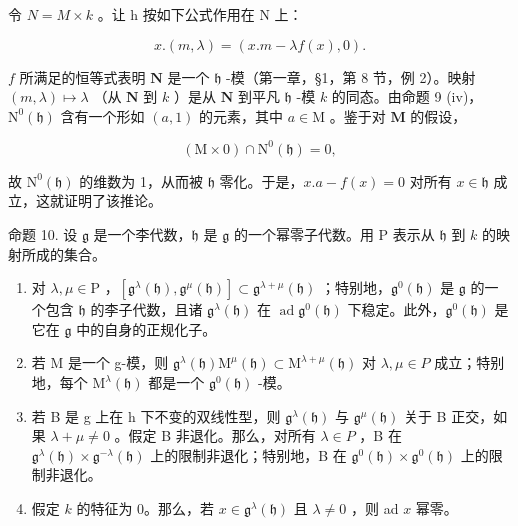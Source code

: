 令 \(N = M \times k\) 。让 h 按如下公式作用在 N 上：

\[
x. (m, \lambda) = (x. m - \lambda f (x), 0).
\]

\(f\) 所满足的恒等式表明 \(\mathbf{N}\) 是一个 \(\mathfrak{h}\) -模（第一章，§1，第 8 节，例 2）。映射 \((m, \lambda) \mapsto \lambda\) （从 \(\mathbf{N}\) 到 \(k\) ）是从 \(\mathbf{N}\) 到平凡 \(\mathfrak{h}\) -模 \(k\) 的同态。由命题 9 (iv)，\(\mathrm{N}^0(\mathfrak{h})\) 含有一个形如 \((a, 1)\) 的元素，其中 \(a \in \mathrm{M}\) 。鉴于对 \(\mathbf{M}\) 的假设，

\[
(\mathrm{M} \times 0) \cap \mathrm{N} ^ {0} (\mathfrak {h}) = 0,
\]

故 \(\mathrm{N}^0 (\mathfrak{h})\) 的维数为 1，从而被 \(\mathfrak{h}\) 零化。于是，\(x.a - f(x) = 0\) 对所有 \(x\in \mathfrak{h}\) 成立，这就证明了该推论。

命题 10. 设 \(\mathfrak{g}\) 是一个李代数，\(\mathfrak{h}\) 是 \(\mathfrak{g}\) 的一个幂零子代数。用 P 表示从 \(\mathfrak{h}\) 到 \(k\) 的映射所成的集合。

\begin{enumerate}
\def\labelenumi{(\roman{enumi})}
\item
  对 \(\lambda, \mu \in \mathrm{P}\) ，\([\mathfrak{g}^{\lambda}(\mathfrak{h}), \mathfrak{g}^{\mu}(\mathfrak{h})] \subset \mathfrak{g}^{\lambda + \mu}(\mathfrak{h})\) ；特别地，\(\mathfrak{g}^{0}(\mathfrak{h})\) 是 \(\mathfrak{g}\) 的一个包含 \(\mathfrak{h}\) 的李子代数，且诸 \(\mathfrak{g}^{\lambda}(\mathfrak{h})\) 在 \(\operatorname{ad} \mathfrak{g}^{0}(\mathfrak{h})\) 下稳定。此外，\(\mathfrak{g}^{0}(\mathfrak{h})\) 是它在 \(\mathfrak{g}\) 中的自身的正规化子。
\item
  若 M 是一个 g-模，则 \(\mathfrak{g}^{\lambda}(\mathfrak{h})\mathrm{M}^{\mu}(\mathfrak{h})\subset\mathrm{M}^{\lambda+\mu}(\mathfrak{h})\) 对 \(\lambda,\mu\in P\) 成立；特别地，每个 \(\mathrm{M}^{\lambda}(\mathfrak{h})\) 都是一个 \(\mathfrak{g}^{0}(\mathfrak{h})\) -模。
\item
  若 B 是 g 上在 h 下不变的双线性型，则 \(\mathfrak{g}^{\lambda}(\mathfrak{h})\) 与 \(\mathfrak{g}^{\mu}(\mathfrak{h})\) 关于 B 正交，如果 \(\lambda + \mu \neq 0\) 。假定 B 非退化。那么，对所有 \(\lambda \in P\) ，B 在 \(\mathfrak{g}^{\lambda}(\mathfrak{h}) \times \mathfrak{g}^{-\lambda}(\mathfrak{h})\) 上的限制非退化；特别地，B 在 \(\mathfrak{g}^{0}(\mathfrak{h}) \times \mathfrak{g}^{0}(\mathfrak{h})\) 上的限制非退化。
\item
  假定 \(k\) 的特征为 0。那么，若 \(x \in \mathfrak{g}^{\lambda}(\mathfrak{h})\) 且 \(\lambda \neq 0\) ，则 ad \(x\) 幂零。
\end{enumerate}


